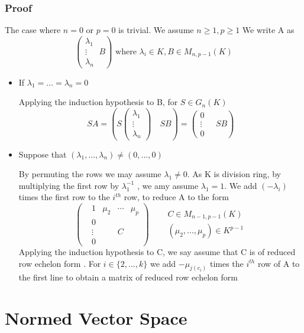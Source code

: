 \documentclass{book}
\begin{document}
\subsection*{Proof}The case where $n=0$ or $p=0$ is trivial.
We assume $n\geq 1,p\geq1$ We write A as $$\left(\begin{aligned}
    \lambda_1\\\vdots\\\lambda_n
\end{aligned}\ B\right) \text{ where }
 \lambda_i\in K, B\in M_{n,p-1}(K)$$
\begin{itemize}
    \item If $\lambda_1=...=\lambda_n=0$ 
    
    Applying the induction hypothesis to B, for $S\in G_n(K)$$$ SA=\left(S\left(\begin{aligned}
        \lambda_1\\\vdots\\\lambda_n
    \end{aligned}\right)\quad SB\right)=\left(\begin{aligned}
        0\\\vdots\\0
    \end{aligned} \quad SB\right)$$
    \item Suppose that $(\lambda_1,...,\lambda_n)\not=(0,...,0)$
    
    By permuting the rows we may assume $\lambda_1\not=0$. As K is division ring, by multiplying the first row by $\lambda_1^{-1}$ , we amy assume $\lambda_1=1$. We add $(-\lambda_i)$ times the first row to the $i^{th}$ row, to reduce A to the form $$\left(\begin{aligned}
        &1 &\mu_2&\cdots&\mu_p\\ & 0\\ &\vdots& &C\\ &0
    \end{aligned}\right)\quad \begin{aligned}
        &C\in M_{n-1,p-1}(K)\\ &(\mu_2,...,\mu_p)\in K^{p-1}
    \end{aligned}$$
    Applying the induction hypothesis to C, we say assume that C is of reduced row echelon form . For $i\in \{2,...,k\}$ we add $-\mu_{j(c_i)}$ times the $i^{th}$ row of A to the first line to obtain a matrix of reduced row echelon form
\end{itemize}
\chapter{Normed Vector Space}
\end{document}
